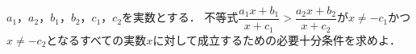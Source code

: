 $a_1$，$a_2$，$b_1$，$b_2$，$c_1$，$c_2$を実数とする．
不等式$\dfrac{a_1x+b_1}{x+c_1} > \dfrac{a_2x+b_2}{x+c_2}$が$x\neq -c_1$かつ$x\neq -c_2$となるすべての実数$x$に対して成立するための必要十分条件を求めよ．
